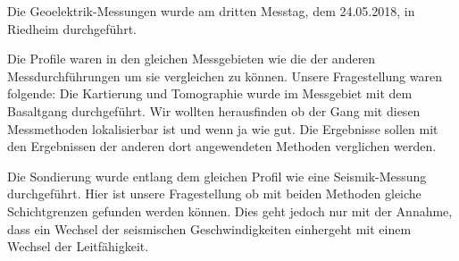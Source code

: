 Die Geoelektrik-Messungen wurde am dritten Messtag, dem 24.05.2018, in Riedheim durchgeführt.

Die Profile waren in den gleichen Messgebieten wie die der anderen Messdurchführungen um sie vergleichen zu können. Unsere Fragestellung waren folgende: 
Die Kartierung und Tomographie wurde im Messgebiet mit dem Basaltgang durchgeführt. Wir wollten herausfinden ob der Gang mit diesen Messmethoden lokalisierbar ist und wenn ja wie gut. Die Ergebnisse sollen mit den Ergebnissen der anderen dort angewendeten Methoden verglichen werden.

Die Sondierung wurde entlang dem gleichen Profil wie eine Seismik-Messung durchgeführt. Hier ist unsere Fragestellung ob mit beiden Methoden gleiche Schichtgrenzen gefunden werden können. Dies geht jedoch nur mit der Annahme, dass ein Wechsel der seismischen Geschwindigkeiten einhergeht mit einem Wechsel der Leitfähigkeit. 




